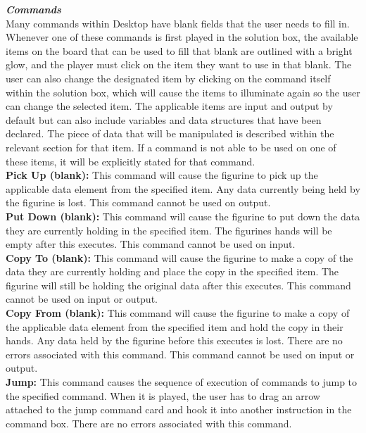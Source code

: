 \textbf{\textit{Commands}}\\
Many commands within Desktop have blank fields that the user needs to fill in. Whenever one of these commands
 is first played in the solution box, the available items on the board that can be used to fill that blank are outlined 
with a bright glow, and the player must click on the item they want to use in that blank. The user can also change 
the designated item by clicking on the command itself within the solution box, which will cause the items to illuminate 
again so the user can change the selected item. The applicable items are input and output by default but can also 
include variables and data structures that have been declared. The piece of data that will be manipulated is described 
within the relevant section for that item. If a command is not able to be used on one of these items, it will be explicitly 
stated for that command.\\

\textbf{Pick Up (blank):}
This command will cause the figurine to pick up the applicable data element from the specified item. Any data currently 
being held by the figurine is lost. This command cannot be used on output.\\

\textbf{Put Down (blank):}
This command will cause the figurine to put down the data they are currently holding in the specified item. The figurines 
hands will be empty after this executes. This command cannot be used on input.\\

\textbf{Copy To (blank):}
This command will cause the figurine to make a copy of the data they are currently holding and place the copy in the 
specified item. The figurine will still be holding the original data after this executes. This command cannot be used on 
input or output.\\

\textbf{Copy From (blank):}
This command will cause the figurine to make a copy of the applicable data element from the specified item and hold 
the copy in their hands. Any data held by the figurine before this executes is lost. There are no errors associated with 
this command. This command cannot be used on input or output.\\

\textbf{Jump:}
This command causes the sequence of execution of commands to jump to the specified command. When it is played, 
the user has to drag an arrow attached to the jump command card and hook it into another instruction in the command 
box. There are no errors associated with this command.\\

